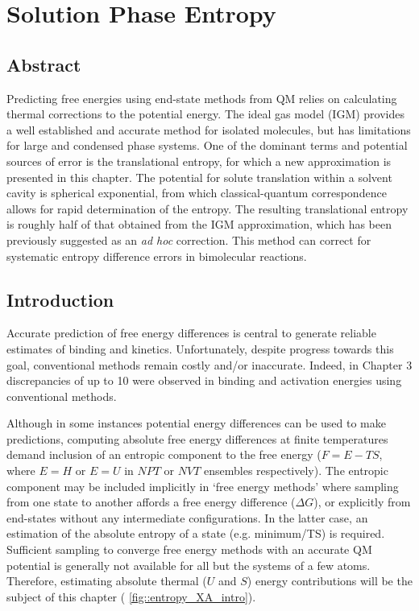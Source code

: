 \documentclass[../main.tex]{subfiles}
\begin{document}
\setcounter{footnote}{0} 



\chapter{Solution Phase Entropy}

\section{Abstract}

Predicting free energies using end-state methods from QM relies on calculating thermal corrections to the potential energy. The ideal gas model (IGM) provides a well established and accurate method for isolated molecules, but has limitations for large and condensed phase systems. One of the dominant terms and potential sources of error is the translational entropy, for which a new approximation is presented in this chapter. The potential for solute translation within a solvent cavity is spherical exponential, from which classical-quantum correspondence allows for rapid determination of the entropy. The resulting translational entropy is roughly half of that obtained from the IGM approximation, which has been previously suggested as an \emph{ad hoc} correction. This method can correct for systematic entropy difference errors in bimolecular reactions.


\section{Introduction}

Accurate prediction of free energy differences is central to generate reliable estimates of binding and kinetics. Unfortunately, despite progress towards this goal, conventional methods remain costly and/or inaccurate. Indeed, in Chapter 3 discrepancies of up to 10 \kcalx were observed in binding and activation energies using conventional methods.

Although in some instances potential energy differences can be used to make predictions, computing absolute free energy differences at finite temperatures demand inclusion of an entropic component to the free energy ($F = E - TS$, where $E= H$ or $E=U$ in $NPT$ or $NVT$ ensembles respectively). The entropic component may be included implicitly in `free energy methods' where sampling from one state to another affords a free energy difference ($\Delta G$),\cite{Boresch2003, Mobley2017, Armacost2020, Zhou2009} or explicitly from end-states without any intermediate configurations. In the latter case, an estimation of the absolute entropy of a state (e.g. minimum/TS) is required.\cite{Jensen1999} Sufficient sampling to converge free energy methods with an accurate QM potential is generally not available for all but the systems of a few atoms.\cite{Iftimie2005} Therefore, estimating absolute thermal ($U$ and $S$) energy contributions will be the subject of this chapter (\figurename{ \ref{fig::entropy_XA_intro}}).
\end{document}
